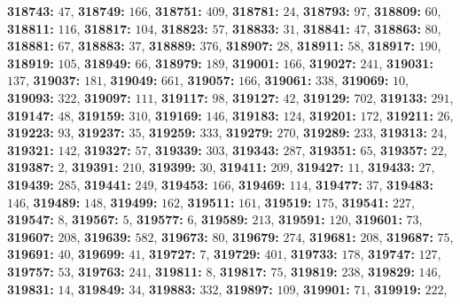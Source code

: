 \textsf{\bfseries 318743:} $47$, \textsf{\bfseries 318749:} $166$, \textsf{\bfseries 318751:} $409$, \textsf{\bfseries 318781:} $24$, \textsf{\bfseries 318793:} $97$, \textsf{\bfseries 318809:} $60$, \textsf{\bfseries 318811:} $116$, \textsf{\bfseries 318817:} $104$, \textsf{\bfseries 318823:} $57$, \textsf{\bfseries 318833:} $31$, \textsf{\bfseries 318841:} $47$, \textsf{\bfseries 318863:} $80$, \textsf{\bfseries 318881:} $67$, \textsf{\bfseries 318883:} $37$, \textsf{\bfseries 318889:} $376$, \textsf{\bfseries 318907:} $28$, \textsf{\bfseries 318911:} $58$, \textsf{\bfseries 318917:} $190$, \textsf{\bfseries 318919:} $105$, \textsf{\bfseries 318949:} $66$, \textsf{\bfseries 318979:} $189$, \textsf{\bfseries 319001:} $166$, \textsf{\bfseries 319027:} $241$, \textsf{\bfseries 319031:} $137$, \textsf{\bfseries 319037:} $181$, \textsf{\bfseries 319049:} $661$, \textsf{\bfseries 319057:} $166$, \textsf{\bfseries 319061:} $338$, \textsf{\bfseries 319069:} $10$, \textsf{\bfseries 319093:} $322$, \textsf{\bfseries 319097:} $111$, \textsf{\bfseries 319117:} $98$, \textsf{\bfseries 319127:} $42$, \textsf{\bfseries 319129:} $702$, \textsf{\bfseries 319133:} $291$, \textsf{\bfseries 319147:} $48$, \textsf{\bfseries 319159:} $310$, \textsf{\bfseries 319169:} $146$, \textsf{\bfseries 319183:} $124$, \textsf{\bfseries 319201:} $172$, \textsf{\bfseries 319211:} $26$, \textsf{\bfseries 319223:} $93$, \textsf{\bfseries 319237:} $35$, \textsf{\bfseries 319259:} $333$, \textsf{\bfseries 319279:} $270$, \textsf{\bfseries 319289:} $233$, \textsf{\bfseries 319313:} $24$, \textsf{\bfseries 319321:} $142$, \textsf{\bfseries 319327:} $57$, \textsf{\bfseries 319339:} $303$, \textsf{\bfseries 319343:} $287$, \textsf{\bfseries 319351:} $65$, \textsf{\bfseries 319357:} $22$, \textsf{\bfseries 319387:} $2$, \textsf{\bfseries 319391:} $210$, \textsf{\bfseries 319399:} $30$, \textsf{\bfseries 319411:} $209$, \textsf{\bfseries 319427:} $11$, \textsf{\bfseries 319433:} $27$, \textsf{\bfseries 319439:} $285$, \textsf{\bfseries 319441:} $249$, \textsf{\bfseries 319453:} $166$, \textsf{\bfseries 319469:} $114$, \textsf{\bfseries 319477:} $37$, \textsf{\bfseries 319483:} $146$, \textsf{\bfseries 319489:} $148$, \textsf{\bfseries 319499:} $162$, \textsf{\bfseries 319511:} $161$, \textsf{\bfseries 319519:} $175$, \textsf{\bfseries 319541:} $227$, \textsf{\bfseries 319547:} $8$, \textsf{\bfseries 319567:} $5$, \textsf{\bfseries 319577:} $6$, \textsf{\bfseries 319589:} $213$, \textsf{\bfseries 319591:} $120$, \textsf{\bfseries 319601:} $73$, \textsf{\bfseries 319607:} $208$, \textsf{\bfseries 319639:} $582$, \textsf{\bfseries 319673:} $80$, \textsf{\bfseries 319679:} $274$, \textsf{\bfseries 319681:} $208$, \textsf{\bfseries 319687:} $75$, \textsf{\bfseries 319691:} $40$, \textsf{\bfseries 319699:} $41$, \textsf{\bfseries 319727:} $7$, \textsf{\bfseries 319729:} $401$, \textsf{\bfseries 319733:} $178$, \textsf{\bfseries 319747:} $127$, \textsf{\bfseries 319757:} $53$, \textsf{\bfseries 319763:} $241$, \textsf{\bfseries 319811:} $8$, \textsf{\bfseries 319817:} $75$, \textsf{\bfseries 319819:} $238$, \textsf{\bfseries 319829:} $146$, \textsf{\bfseries 319831:} $14$, \textsf{\bfseries 319849:} $34$, \textsf{\bfseries 319883:} $332$, \textsf{\bfseries 319897:} $109$, \textsf{\bfseries 319901:} $71$, \textsf{\bfseries 319919:} $222$, 
